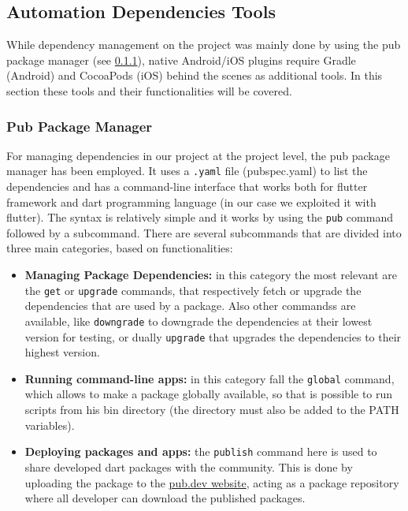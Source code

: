 \subsection{Automation Dependencies Tools}
While dependency management on the project was mainly done by using the pub package manager (see \cref{subsubsec:pub}), native Android/iOS plugins require Gradle (Android) and CocoaPods (iOS) behind the scenes as additional tools. In this section these tools and their functionalities will be covered.

\subsubsection{Pub Package Manager}
\label{subsubsec:pub}

For managing dependencies in our project at the project level, the pub package manager has been employed. It uses a \texttt{.yaml} file (pubspec.yaml) to list the dependencies and has a command-line interface that works both for flutter framework and dart programming language (in our case we exploited it with flutter). The syntax is relatively simple and it works by using the \texttt{pub} command followed by a subcommand. \newline There are several subcommands that are divided into three main categories, based on functionalities\cite{Pub}:
\vspace{3ex}
\begin{itemize}[nosep]
    \item \textbf{Managing Package Dependencies:} in this category the most relevant are the \texttt{get} or \texttt{upgrade} commands, that respectively fetch or upgrade the dependencies that are used by a package. Also other commandss are available, like \texttt{downgrade} to downgrade the dependencies at their lowest version for testing, or dually \texttt{upgrade} that upgrades the dependencies to their highest version. 
    \item \textbf{Running command-line apps:} in this category fall the \texttt{global} command, which allows to make a package globally available, so that is possible to run scripts from his bin directory (the directory must also be added to the PATH variables).
    \item \textbf{Deploying packages and apps:} the \texttt{publish} command here is used to share developed dart packages with the community. This is done by uploading the package to the \href{https://pub.dev/}{pub.dev website}, acting as a package repository where all developer can download the published packages. 
\end{itemize}

